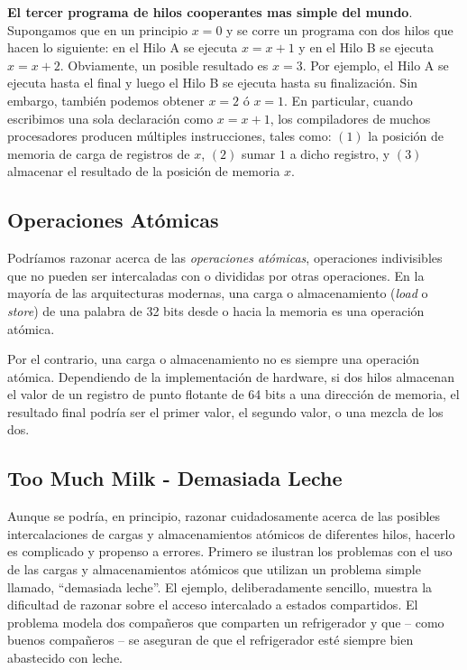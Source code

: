\documentclass[10pt]{book}
\begin{document}
\textbf{El tercer programa de hilos cooperantes mas simple del mundo}. Supongamos que en un principio $x = 0$ y se corre un programa con dos hilos que hacen lo siguiente: en el Hilo A se ejecuta $x = x + 1$ y en el Hilo B se ejecuta $x = x + 2$. Obviamente, un posible resultado es $x = 3$. Por ejemplo, el Hilo A se ejecuta hasta el final y luego el Hilo B se ejecuta hasta su finalización. Sin embargo, también podemos obtener $x = 2$ ó $x = 1$. En particular, cuando escribimos una sola declaración como $x = x + 1$, los compiladores de muchos procesadores producen múltiples instrucciones, tales como: $(1)$ la posición de memoria de carga de registros de $x$, $(2)$ sumar $1$ a dicho registro, y $(3)$ almacenar el resultado de la posición de memoria $x$.

\subsection{Operaciones Atómicas}
Podríamos razonar acerca de las \textit{operaciones atómicas}, operaciones indivisibles que no pueden ser intercaladas con o divididas por otras operaciones. En la mayoría de las arquitecturas modernas, una carga o almacenamiento (\textit{load} o \textit{store}) de una palabra de 32 bits desde o hacia la memoria es una operación atómica.

Por el contrario, una carga o almacenamiento no es siempre una operación atómica. Dependiendo de la implementación de hardware, si dos hilos almacenan el valor de un registro de punto flotante de 64 bits a una dirección de memoria, el resultado final podría ser el primer valor, el segundo valor, o una mezcla de los dos.

\subsection{Too Much Milk - Demasiada Leche}
Aunque se podría, en principio, razonar cuidadosamente acerca de las posibles intercalaciones de cargas y almacenamientos atómicos de diferentes hilos, hacerlo es complicado y propenso a errores. Primero se ilustran los problemas con el uso de las cargas y almacenamientos atómicos que utilizan un problema simple llamado, ``demasiada leche''. El ejemplo, deliberadamente sencillo, muestra la dificultad de razonar sobre el acceso intercalado a estados compartidos. El problema modela dos compañeros que comparten un refrigerador y que -- como buenos compañeros -- se aseguran de que el refrigerador esté siempre bien abastecido con leche.
\end{document}
